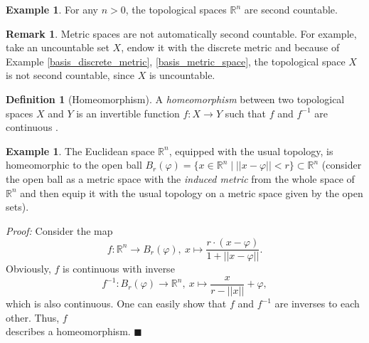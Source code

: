 \documentclass[12pt, a4paper]{article}
\numberwithin{equation}{section}
\theoremstyle{definition}
\theoremstyle{definition}
\newtheorem{defn}[thm]{Definition} %
\newtheorem{exmp}[thm]{Example} %
\newtheorem{remark}[thm]{Remark} %
\begin{document}
	\begin{exmp}
		For any $n > 0$, the topological spaces $\mathbb R^n$ are second countable. 
	\end{exmp}
	
	\begin{remark}
		Metric spaces are not automatically second countable. For example, take an uncountable set $X$, endow it with the discrete metric and because of Example \ref{basis_discrete_metric}, \ref{basis_metric_space},  the topological space $X$ is not second countable, since $X$ is uncountable. 
	\end{remark}
	
	\begin{defn}[Homeomorphism] A \textit{homeomorphism} between two topological spaces $X$ and $Y$ is an invertible function $f: X\rightarrow Y$ such that $f$ and $f^{-1}$ are continuous \cite[p. 33]{topology-singh}. 
	\end{defn}

	\begin{exmp}
		The Euclidean space $\mathbb R^n$, equipped with the usual topology, is homeomorphic to the open ball $B_{r}(\varphi) =  \{x\in\mathbb R^n \mid \lvert\lvert x-\varphi \rvert\rvert < r \} \subset \mathbb R^n$ (consider the open ball as a metric space with the \textit{induced metric} from the whole space of $\mathbb R^n$ and then equip it with the usual topology on a metric space given by the open sets). 
	\end{exmp}
	\noindent\textit{Proof:} Consider the map $$f: \mathbb R^n\rightarrow B_r(\varphi), \ x\mapsto \frac{r\cdot (x-\varphi)}{1+\lvert\lvert x-\varphi\rvert\rvert}.$$ Obviously, $f$ is continuous with inverse $$f^{-1}: B_r(\varphi)\rightarrow \mathbb R^n, \ x \mapsto \frac{x}{r-\lvert\lvert x\rvert\rvert}+\varphi,$$ which is also continuous. One can easily show that $f$ and $f^{-1}$ are inverses to each other. Thus, $f$ \\ describes a homeomorphism. 	\qquad\qquad\qquad\qquad\qquad\qquad\qquad\qquad\qquad\qquad\qquad\qquad\qquad\qquad\qquad$\blacksquare$
	
\end{document}
